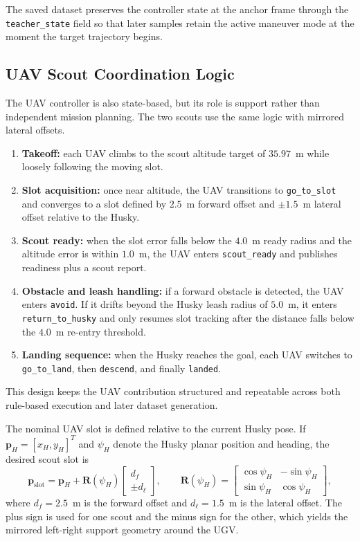 The saved dataset preserves the controller state at the anchor frame through the \texttt{teacher\_state} field so that later samples retain the active maneuver mode at the moment the target trajectory begins.

\subsection{UAV Scout Coordination Logic}

The UAV controller is also state-based, but its role is support rather than independent mission planning. The two scouts use the same logic with mirrored lateral offsets.

\begin{enumerate}
\item \textbf{Takeoff:} each UAV climbs to the scout altitude target of $35.97$~m while loosely following the moving slot.
\item \textbf{Slot acquisition:} once near altitude, the UAV transitions to \texttt{go\_to\_slot} and converges to a slot defined by $2.5$~m forward offset and $\pm1.5$~m lateral offset relative to the Husky.
\item \textbf{Scout ready:} when the slot error falls below the $4.0$~m ready radius and the altitude error is within $1.0$~m, the UAV enters \texttt{scout\_ready} and publishes readiness plus a scout report.
\item \textbf{Obstacle and leash handling:} if a forward obstacle is detected, the UAV enters \texttt{avoid}. If it drifts beyond the Husky leash radius of $5.0$~m, it enters \texttt{return\_to\_husky} and only resumes slot tracking after the distance falls below the $4.0$~m re-entry threshold.
\item \textbf{Landing sequence:} when the Husky reaches the goal, each UAV switches to \texttt{go\_to\_land}, then \texttt{descend}, and finally \texttt{landed}.
\end{enumerate}

This design keeps the UAV contribution structured and repeatable across both rule-based execution and later dataset generation.

The nominal UAV slot is defined relative to the current Husky pose. If $\mathbf{p}_H=[x_H, y_H]^T$ and $\psi_H$ denote the Husky planar position and heading, the desired scout slot is
\[
\mathbf{p}_{\text{slot}} = \mathbf{p}_H + \mathbf{R}(\psi_H)
\begin{bmatrix}
d_f \\
\pm d_\ell
\end{bmatrix},
\qquad
\mathbf{R}(\psi_H)=
\begin{bmatrix}
\cos\psi_H & -\sin\psi_H \\
\sin\psi_H & \cos\psi_H
\end{bmatrix},
\]
where $d_f=2.5$~m is the forward offset and $d_\ell=1.5$~m is the lateral offset. The plus sign is used for one scout and the minus sign for the other, which yields the mirrored left-right support geometry around the UGV.


